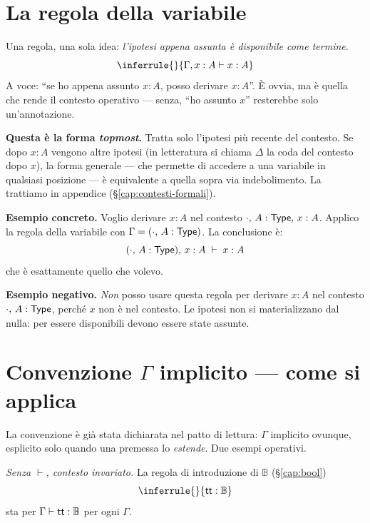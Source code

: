 \section*{La regola della variabile}

Una regola, una sola idea: \emph{l'ipotesi appena assunta \`e disponibile come termine}.
\[
\inferrule{ }{\Gamma, x : A \vdash x : A}
\]
A voce: ``se ho appena assunto $x : A$, posso derivare $x : A$''. \`E ovvia, ma \`e quella che rende il contesto operativo --- senza, ``ho assunto $x$'' resterebbe solo un'annotazione.

\bigskip

\noindent\textbf{Questa \`e la forma \emph{topmost}.} Tratta solo l'ipotesi pi\`u recente del contesto. Se dopo $x : A$ vengono altre ipotesi (in letteratura si chiama $\Delta$ la coda del contesto dopo $x$), la forma generale --- che permette di accedere a una variabile in qualsiasi posizione --- \`e equivalente a quella sopra via indebolimento. La trattiamo in appendice (\S\ref{cap:contesti-formali}).

\bigskip

\noindent\textbf{Esempio concreto.} Voglio derivare $x : A$ nel contesto $\cdot,\, A : \mathsf{Type},\, x : A$. Applico la regola della variabile con $\Gamma = (\cdot,\, A : \mathsf{Type})$. La conclusione \`e:
\[
(\cdot,\, A : \mathsf{Type}),\, x : A \;\vdash\; x : A
\]
che \`e esattamente quello che volevo. \checkmark

\bigskip

\noindent\textbf{Esempio negativo.} \emph{Non} posso usare questa regola per derivare $x : A$ nel contesto $\cdot,\, A : \mathsf{Type}$, perch\'e $x$ non \`e nel contesto. Le ipotesi non si materializzano dal nulla: per essere disponibili devono essere state assunte.

\section*{Convenzione $\Gamma$ implicito --- come si applica}

La convenzione \`e gi\`a stata dichiarata nel patto di lettura: $\Gamma$ implicito ovunque, esplicito solo quando una premessa lo \emph{estende}. Due esempi operativi.

\medskip

\noindent \emph{Senza $\vdash$, contesto invariato.} La regola di introduzione di $\mathbb{B}$ (\S\ref{cap:bool})
\[
\inferrule{ }{\tto : \mathbb{B}}
\]
sta per $\Gamma \vdash \mathsf{tt} : \mathbb{B}$ per ogni $\Gamma$.

